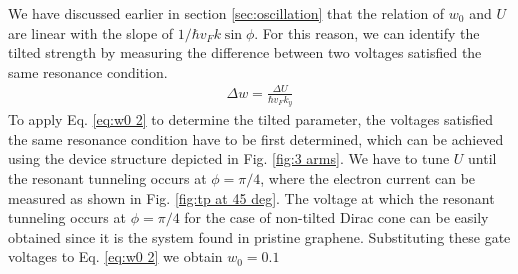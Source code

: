     We have discussed earlier in section \ref{sec:oscillation} that the relation of $w_0$ and $U$ are linear with the slope of $1/\hbar v_F k \sin{\phi}$.
    For this reason, we can identify the tilted strength by measuring the difference between two voltages satisfied the same resonance condition.
    \begin{align} \label{eq:w0 2}
        \Delta w = \frac{\Delta U}{\hbar v_F k_y}
    \end{align}
    To apply Eq. \ref{eq:w0 2} to determine the tilted parameter, the voltages satisfied the same resonance condition have to be first determined,
    which can be achieved using the device structure depicted in Fig. \ref{fig:3 arms}. We have to tune $U$ until the resonant tunneling occurs at $\phi = \pi/4$,
    where the electron current can be measured as shown in Fig. \ref{fig:tp at 45 deg}.
    The voltage at which the resonant tunneling occurs at $\phi = \pi/4$ for the case of non-tilted Dirac cone can be easily obtained since it is the system found in pristine graphene.
    Substituting these gate voltages to Eq. \ref{eq:w0 2} we obtain $w_0 =0.1$

